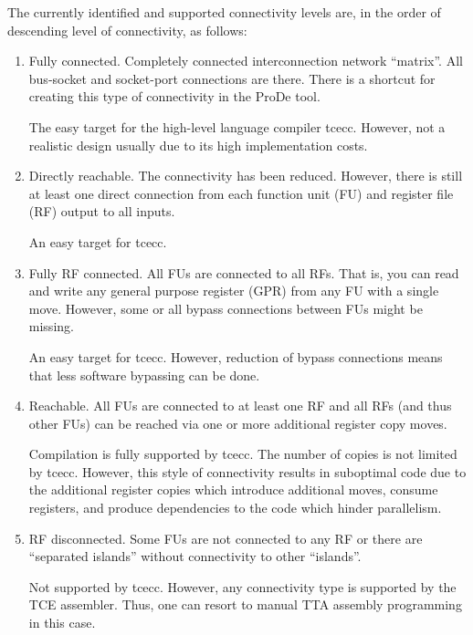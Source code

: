 \documentclass[twoside]{tceusermanual}
\begin{document}
The currently identified and supported connectivity levels are, in the order of 
descending level of connectivity, as follows:
\begin{enumerate}

\item Fully connected. Completely connected interconnection network ``matrix''.
All bus-socket and socket-port connections are there. There is a shortcut for
creating this type of connectivity in the ProDe tool.

The easy target for the high-level language compiler tcecc. However, not
a realistic design usually due to its high implementation costs.

\item Directly reachable. The connectivity has been reduced. However, there is
still at least one direct connection from each function unit (FU) and register file 
(RF) output to all inputs.

An easy target for tcecc.

\item Fully RF connected. All FUs are connected to all RFs. That is, you can 
read and write any general purpose register (GPR) from any FU with a single
move. However, some or all bypass connections between FUs might be missing.

An easy target for tcecc. However, reduction of bypass connections means
that less software bypassing can be done.

\item Reachable. All FUs are connected to at least one RF and all RFs (and thus
other FUs) can be reached via one or more additional register copy moves. 

Compilation is fully supported by tcecc. The number of copies is not 
limited by tcecc. However, this style of connectivity results in suboptimal code due to the
additional register copies which introduce additional moves, consume registers, and
produce dependencies to the code which hinder parallelism.

\item RF disconnected. Some FUs are not connected to any RF or there are 
``separated islands'' without connectivity to other ``islands''.

Not supported by tcecc. However, any connectivity type is supported by 
the TCE assembler. Thus, one can resort to manual TTA assembly programming in
this case.

\end{enumerate}
\end{document}
